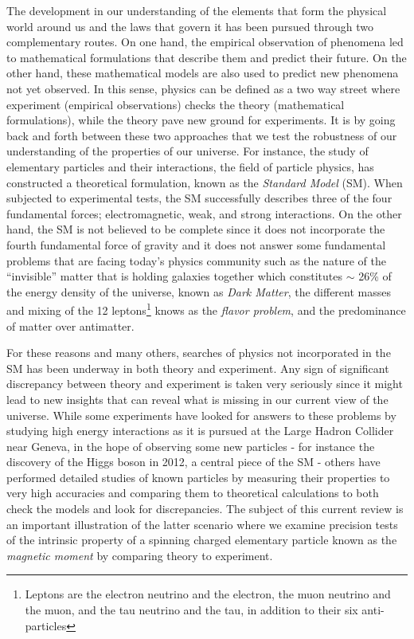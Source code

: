 \documentclass{outhesis}
\begin{document}
The development in our understanding of the elements that form the physical world around us and the laws that govern it has been pursued through two complementary routes. On one hand, the empirical observation of phenomena led to mathematical formulations that describe them and predict their future. On the other hand, these mathematical models are also used to predict new phenomena not yet observed. In this sense, physics can be defined as a two way street where experiment (empirical observations) checks the theory (mathematical formulations), while the theory pave new ground for experiments. It is by going back and forth between these two approaches that we test the robustness of our understanding of the properties of our universe. For instance, the study of elementary particles and their interactions, the field of particle physics, has constructed a theoretical formulation, known as the \emph{Standard Model} (SM). When subjected to experimental tests, the SM successfully describes three of the four fundamental forces; electromagnetic, weak, and strong interactions. On the other hand, the SM is not believed to be complete since it does not incorporate the fourth fundamental force of gravity and it does not answer 
some fundamental problems that are facing today's physics community such as the nature of the ``invisible'' matter that is holding galaxies together which constitutes $\sim$ 26\% of the energy density of the universe, known as \emph{Dark Matter}, the different masses and mixing of the 12 leptons\footnote{Leptons are the electron neutrino and the electron, the muon neutrino and the muon, and the tau neutrino and the tau, in addition to their six anti-particles } knows as the \emph{flavor problem}, and the predominance of matter over antimatter. 
 
For these reasons and many others, searches of physics not incorporated in the SM has been underway in both theory and experiment. Any sign of significant discrepancy between theory and experiment is taken very seriously since it might lead to new insights that can reveal what is missing in our current view of the universe. While some experiments have looked for answers to these problems by studying high energy interactions as it is pursued at the Large Hadron Collider near Geneva, in the hope of observing some new particles - for instance the discovery of the Higgs boson in 2012, a central piece of the SM - others have performed detailed studies of known particles by measuring their properties to very high accuracies and comparing them to theoretical calculations to both check the models and look for discrepancies. The subject of this current review is an important illustration of the latter scenario where we examine precision tests of the intrinsic property of a spinning charged elementary particle known as the \emph{magnetic moment} by comparing theory to experiment.
\end{document}
